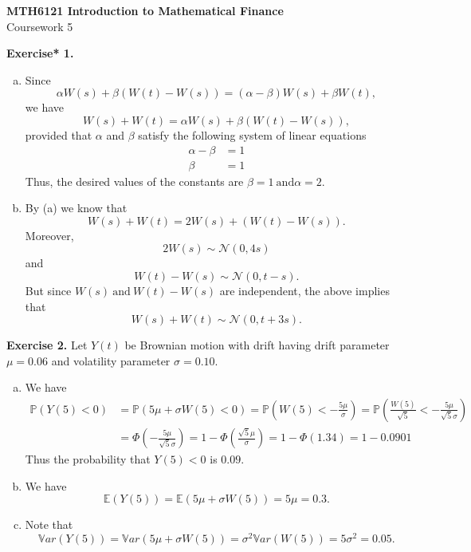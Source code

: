 \documentclass[11pt,a4paper]{report}
\begin{document}
    \begin{center}
        \LARGE\textbf{MTH6121 Introduction to Mathematical Finance}\\
        Coursework 5
    \end{center}
    \textbf{Exercise* 1.}
    \begin{enumerate}[(a)]
        \item Since
        $$\alpha W(s) + \beta (W(t) − W(s)) = (\alpha − \beta)W(s) + \beta W(t),$$
        we have
        $$W(s) + W(t) = \alpha W(s) + \beta (W(t) − W(s)),$$
        provided that $\alpha$ and $\beta$ satisfy the following system of linear equations
        \begin{align*}
            \alpha - \beta &= 1\\
            \beta &= 1
        \end{align*}
        Thus, the desired values of the constants are $\beta = 1\ \text{and} \alpha = 2$.
        \item By (a) we know that
        $$W(s) + W(t) = 2W(s) + (W(t) − W(s)).$$
        Moreover,
        $$2W(s) \sim \mathcal{N} (0, 4s)$$
        and
        $$W(t) − W(s) \sim \mathcal{N} (0, t − s).$$
        But since $W(s)\ \text{and}\ W(t) − W(s)$ are independent, the above implies that
        $$W(s) + W(t) \sim \mathcal{N} (0, t + 3s).$$
    \end{enumerate}
    \textbf{Exercise 2.} Let $Y (t)$ be Brownian motion with drift having drift parameter $\mu = 0.06$ and volatility parameter $\sigma = 0.10$.
    \begin{enumerate}[(a)]
        \item We have
        \begin{align*}
            \mathbb{P}(Y (5) < 0) &= \mathbb{P}(5\mu + \sigma W(5) < 0)=\mathbb{P}\left(W(5)<-\frac{5\mu}{\sigma}\right)=\mathbb{P}\left(\frac{W(5)}{\sqrt{5}}<-\frac{5\mu}{\sqrt{5}\sigma}\right)\\
            &= \Phi\left(-\frac{5\mu}{\sqrt{5}\sigma}\right)=1-\Phi\left(\frac{\sqrt{5}\mu}{\sigma}\right)=1-\Phi(1.34) = 1-0.0901
        \end{align*}
        Thus the probability that $Y (5) < 0$ is $0.09$.
        \item We have
        $$\mathbb{E}(Y (5)) = \mathbb{E}(5\mu + \sigma W(5)) = 5\mu = 0.3 .$$
        \item  Note that
        $$\mathbb{V}ar(Y (5)) = \mathbb{V}ar(5\mu + \sigma W(5)) = \sigma^2\mathbb{V}ar(W(5)) = 5\sigma^2 = 0.05 .$$
    \end{enumerate}
\end{document}
